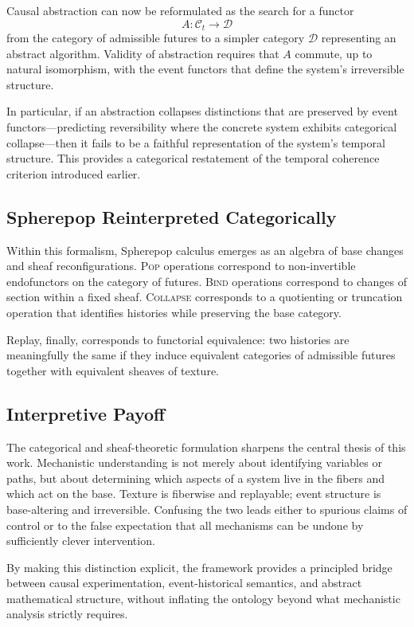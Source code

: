 \documentclass[11pt]{article}
\begin{document}
Causal abstraction can now be reformulated as the search for a functor
\[
A : \mathcal{C}_t \longrightarrow \mathcal{D}
\]
from the category of admissible futures to a simpler category $\mathcal{D}$
representing an abstract algorithm. Validity of abstraction requires that $A$
commute, up to natural isomorphism, with the event functors that define the
system’s irreversible structure.

In particular, if an abstraction collapses distinctions that are preserved by
event functors—predicting reversibility where the concrete system exhibits
categorical collapse—then it fails to be a faithful representation of the
system’s temporal structure. This provides a categorical restatement of the
temporal coherence criterion introduced earlier.

\subsection{Spherepop Reinterpreted Categorically}

Within this formalism, Spherepop calculus emerges as an algebra of base changes
and sheaf reconfigurations. \textsc{Pop} operations correspond to non-invertible
endofunctors on the category of futures. \textsc{Bind} operations correspond to
changes of section within a fixed sheaf. \textsc{Collapse} corresponds to a
quotienting or truncation operation that identifies histories while preserving
the base category.

Replay, finally, corresponds to functorial equivalence: two histories are
meaningfully the same if they induce equivalent categories of admissible
futures together with equivalent sheaves of texture.

\subsection{Interpretive Payoff}

The categorical and sheaf-theoretic formulation sharpens the central thesis of
this work. Mechanistic understanding is not merely about identifying variables
or paths, but about determining which aspects of a system live in the fibers and
which act on the base. Texture is fiberwise and replayable; event structure is
base-altering and irreversible. Confusing the two leads either to spurious
claims of control or to the false expectation that all mechanisms can be undone
by sufficiently clever intervention.

By making this distinction explicit, the framework provides a principled bridge
between causal experimentation, event-historical semantics, and abstract
mathematical structure, without inflating the ontology beyond what mechanistic
analysis strictly requires.
\end{document}
